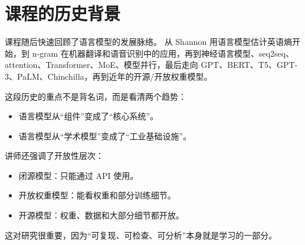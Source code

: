 \section{课程的历史背景}

课程随后快速回顾了语言模型的发展脉络。
从 Shannon 用语言模型估计英语熵开始，到 n-gram 在机器翻译和语音识别中的应用，再到神经语言模型、seq2seq、attention、Transformer、MoE、模型并行，最后走向 GPT、BERT、T5、GPT-3、PaLM、Chinchilla，再到近年的开源/开放权重模型。

这段历史的重点不是背名词，而是看清两个趋势：
\begin{itemize}
    \item 语言模型从“组件”变成了“核心系统”。
    \item 语言模型从“学术模型”变成了“工业基础设施”。
\end{itemize}

讲师还强调了开放性层次：
\begin{itemize}
    \item 闭源模型：只能通过 API 使用。
    \item 开放权重模型：能看权重和部分训练细节。
    \item 开源模型：权重、数据和大部分细节都开放。
\end{itemize}

这对研究很重要，因为“可复现、可检查、可分析”本身就是学习的一部分。

